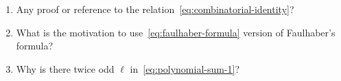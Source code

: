 \begin{enumerate}
    \item Any proof or reference to the relation~\eqref{eq:combinatorial-identity}?
    \item What is the motivation to use~\eqref{eq:faulhaber-formula} version of Faulhaber's formula?
    \item Why is there twice odd $\ell$ in~\eqref{eq:polynomial-sum-1}?
\end{enumerate}